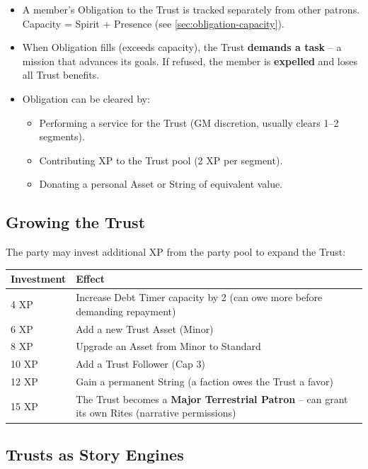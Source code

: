 \begin{itemize}
  \item A member's Obligation to the Trust is tracked separately from other patrons. Capacity = Spirit + Presence (see \ref{sec:obligation-capacity}).
  \item When Obligation fills (exceeds capacity), the Trust \textbf{demands a task} -- a mission that advances its goals. If refused, the member is \textbf{expelled} and loses all Trust benefits.
  \item Obligation can be cleared by:
  \begin{itemize}
    \item Performing a service for the Trust (GM discretion, usually clears 1--2 segments).
    \item Contributing XP to the Trust pool (2 XP per segment).
    \item Donating a personal Asset or String of equivalent value.
  \end{itemize}
\end{itemize}

\subsection{Growing the Trust}
\label{subsec:trust-growth}

The party may invest additional XP from the party pool to expand the Trust:

\begin{center}
\begin{tabular}{ll}
\toprule
\textbf{Investment} & \textbf{Effect} \\
\midrule
4 XP & Increase Debt Timer capacity by 2 (can owe more before demanding repayment) \\
6 XP & Add a new Trust Asset (Minor) \\
8 XP & Upgrade an Asset from Minor to Standard \\
10 XP & Add a Trust Follower (Cap 3) \\
12 XP & Gain a permanent String (a faction owes the Trust a favor) \\
15 XP & The Trust becomes a \textbf{Major Terrestrial Patron} -- can grant its own Rites (narrative permissions) \\
\bottomrule
\end{tabular}
\end{center}

\subsection{Trusts as Story Engines}
\label{subsec:trust-story}

